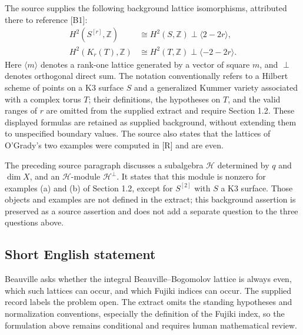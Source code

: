 \documentclass[11pt]{article}
\newcommand{\Z}{\mathbb{Z}}
\begin{document}
The source supplies the following background lattice isomorphisms, attributed there to reference [B1]:
\[
\begin{aligned}
H^2(S^{[r]},\Z)&\cong H^2(S,\Z)\mathbin{\perp}\langle 2-2r\rangle,\\
H^2(K_r(T),\Z)&\cong H^2(T,\Z)\mathbin{\perp}\langle -2-2r\rangle.
\end{aligned}
\]
Here \(\langle m\rangle\) denotes a rank-one lattice generated by a vector of square \(m\), and \(\perp\) denotes orthogonal direct sum. The notation conventionally refers to a Hilbert scheme of points on a K3 surface \(S\) and a generalized Kummer variety associated with a complex torus \(T\); their definitions, the hypotheses on \(T\), and the valid ranges of \(r\) are omitted from the supplied extract and require Section 1.2. These displayed formulas are retained as supplied background, without extending them to unspecified boundary values. The source also states that the lattices of O'Grady's two examples were computed in [R] and are even.

The preceding source paragraph discusses a subalgebra \(\mathcal H\) determined by \(q\) and \(\dim X\), and an \(\mathcal H\)-module \(\mathcal H^\perp\). It states that this module is nonzero for examples (a) and (b) of Section 1.2, except for \(S^{[2]}\) with \(S\) a K3 surface. Those objects and examples are not defined in the extract; this background assertion is preserved as a source assertion and does not add a separate question to the three questions above.
\subsection{Short English statement}
Beauville asks whether the integral Beauville--Bogomolov lattice is always even, which such lattices can occur, and which Fujiki indices can occur. The supplied record labels the problem open. The extract omits the standing hypotheses and normalization conventions, especially the definition of the Fujiki index, so the formulation above remains conditional and requires human mathematical review.
\end{document}

